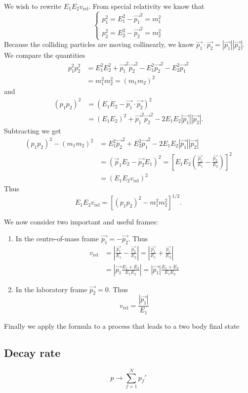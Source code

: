 We wish to rewrite $E_1E_2v_\text{rel}$. From special relativity we know that
\[ \begin{cases}
p_1^2 = E_1^2 - \vec{p_1}^2 = m_1^2 \\
p_2^2 = E_2^2 - \vec{p_2}^2 = m_2^2
\end{cases} \]
Because the colliding particles are moving collinearly, we know $\vec{p_1}\cdot \vec{p_2} = |\vec{p_1}||\vec{p_2}|$.
We compare the quantities
\begin{align*}
p_1^2p_2^2 &= E_1^2 E_2^2 + \vec{p_1}^2 \vec{p_2}^2 - E_1^2 \vec{p_2}^2 - E_2^2 \vec{p_1}^2 \\
&= m_1^2 m_2^2 = (m_1m_2)^2
\end{align*}
and
\begin{align*}
(p_1p_2)^2 &= (E_1E_2 - \vec{p_1}\cdot \vec{p_2})^2 \\
&= (E_1E_2)^2 + \vec{p_1}^2\vec{p_2}^2 - 2E_1E_2 |\vec{p_1}||\vec{p_2}|.
\end{align*}
Subtracting we get
\begin{align*}
(p_1p_2)^2 - (m_1m_2)^2 &= E_1^2 \vec{p_2}^2 + E_2^2 \vec{p_1}^2 - 2E_1E_2 |\vec{p_1}||\vec{p_2}| \\
&= (\vec{p}_1E_2 - \vec{p_2}E_1)^2 = \left[E_1E_2 \left(\frac{\vec{p_1}}{E_1} - \frac{\vec{p_2}}{E_2}\right)\right]^2 \\
&= (E_1E_2 v_\text{rel})^2
\end{align*}
Thus
\[ E_1E_2v_\text{rel} = [(p_1p_2)^2 - m^2_1m_2^2]^{1/2}. \]

We now consider two important and useful frames:
\begin{enumerate}
\item In the centre-of-mass frame $\vec{p_1} = - \vec{p_2}$. Thus
\begin{align*}
v_\text{rel} &= \left| \frac{\vec{p_1}}{E_1} - \frac{\vec{p_2}}{E_2}\right| = \left| \frac{\vec{p_1}}{E_1} + \frac{\vec{p_1}}{E_2}\right| \\
&= \left|\vec{p_1}\frac{E_1+E_2}{E_1E_2}\right| = |\vec{p_1}|\frac{E_1+E_2}{E_1E_2}
\end{align*}
\item In the laboratory frame $\vec{p_2} = 0$. Thus
\[ v_\text{rel} = \frac{|\vec{p_1}|}{E_1} \]
\end{enumerate}
Finally we apply the formula to a process that leads to a two body final state

\subsection{Decay rate}
\[ p \to \sum^N_{f=1}p_f' \]

